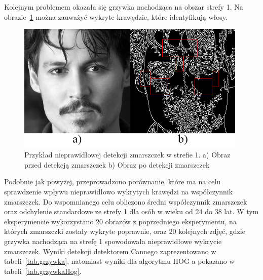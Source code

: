 \documentclass[a4paper,twoside,12pt]{book}
\begin{document}
    Kolejnym problemem okazała się grzywka nachodząca na obszar strefy 1.
    Na obrazie~\ref{fig.grzywka} można zauważyć wykryte krawędzie,
    które identyfikują włosy.
    \begin{figure}[h!]
        \centering
        \includegraphics[width=11cm]{Obrazy/zlyRyjekZGrzywka.jpg}
        \captionsetup{justification=centering}
        \caption{Przykład nieprawidłowej detekcji zmarszczek w strefie 1. \newline
        a) Obraz przed detekcją zmarszczek b) Obraz po detekcji zmarszczek }
        \label{fig.grzywka}
    \end{figure}
    Podobnie jak powyżej, przeprowadzono porównanie,
    które ma na celu sprawdzenie wpływu nieprawidłowo wykrytych krawędzi na współczynnik zmarszczek.
    Do wspomnianego celu obliczono średni współczynnik zmarszczek oraz odchylenie standardowe ze strefy 1 dla osób w
    wieku od 24 do 38 lat. W tym eksperymencie wykorzystano 20 obrazów z poprzedniego eksperymentu, na których
    zmarszczki zostały wykryte poprawnie, oraz 20 kolejnych zdjęć, gdzie grzywka nachodząca na strefę 1
    spowodowała nieprawidłowe wykrycie zmarszczek. Wyniki detekcji detektorem Cannego zaprezentowano w
    tabeli~\ref{tab.grzywka}, natomiast wyniki dla algorytmu HOG-a pokazano w tabeli~\ref{tab.grzywkaHog}.
\end{document}
